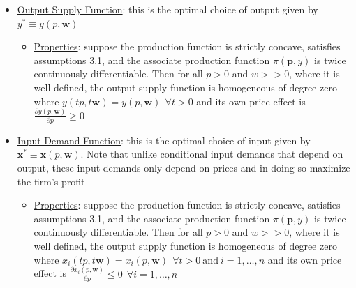 \documentclass{article}
\begin{document}
  \begin{itemize}
    \item  \underline{Output Supply Function}: this is the optimal choice of output given by $y^{*} \equiv y(p, \mathbf{w})$
    \begin{itemize}
      \item  \underline{Properties}: suppose the production function is strictly concave, satisfies assumptions 3.1, and the associate production function $\pi (\mathbf{p},y)$ is twice continuously differentiable. Then for all $p > 0$ and $w >> 0$, where it is well defined, the output supply function is homogeneous of degree zero where $y(tp, t\mathbf{w}) = y(p,\mathbf{w}) \ \ \forall t>0$ and its own price effect is $\tfrac{\partial y(p,\mathbf{w})}{\partial p} \geq 0$
    \end{itemize}
    \item  \underline{Input Demand Function}: this is the optimal choice of input given by $\mathbf{x}^{*} \equiv \mathbf{x}(p,\mathbf{w})$. Note that unlike conditional input demands that depend on output, these input demands only depend on prices and in doing so maximize the firm's profit
    \begin{itemize}
      \item  \underline{Properties}: suppose the production function is strictly concave, satisfies assumptions 3.1, and the associate production function $\pi (\mathbf{p},y)$ is twice continuously differentiable. Then for all $p > 0$ and $w >> 0$, where it is well defined, the output supply function is homogeneous of degree zero where $x_{i}(tp, t\mathbf{w}) = x_{i}(p,\mathbf{w}) \ \ \forall t>0 \ \text{and} \ i=1, \dots, n$ and its own price effect is $\tfrac{\partial x_{i}(p,\mathbf{w})}{\partial p} \leq 0 \ \ \forall i = 1, \dots, n$
    \end{itemize}
  \end{itemize}
  \par
\vspace{6mm}
\end{document}
